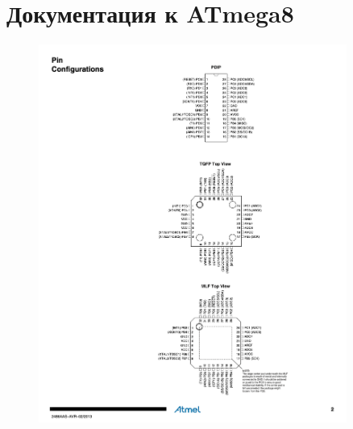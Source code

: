 \chapter{Документация к ATmega8}
\label{appendmk}
% 
% 
% 
\begin{figure}[ht]
	\centering
	\includegraphics[width=0.9\textwidth]{./images/atmega_dh1.png}
	\label{fig:atmega}
\end{figure}


